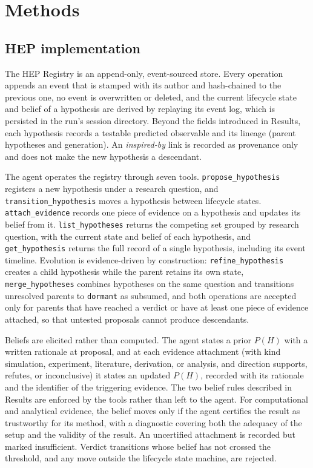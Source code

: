 \section{Methods}\label{sec:methods}

\subsection{HEP implementation}
The HEP Registry is an append-only, event-sourced store.
Every operation appends an event that is stamped with its author and
hash-chained to the previous one, no event is overwritten or deleted,
and the current lifecycle state and belief of a hypothesis are derived
by replaying its event log, which is persisted in the run's session
directory.
Beyond the fields introduced in Results, each hypothesis records a
testable predicted observable and its lineage (parent hypotheses and
generation).
An \emph{inspired-by} link is recorded as provenance only
and does not make the new hypothesis a descendant.

The agent operates the registry through seven tools.
\texttt{propose\_hypothesis} registers a new hypothesis under a
research question, and \texttt{transition\_hypothesis} moves a
hypothesis between lifecycle states.
\texttt{attach\_evidence} records one piece of evidence on a
hypothesis and updates its belief from it.
\texttt{list\_hypotheses} returns the competing set grouped by
research question, with the current state and belief of each
hypothesis, and \texttt{get\_hypothesis} returns the full record of a
single hypothesis, including its event timeline.
Evolution is evidence-driven by construction:
\texttt{refine\_hypothesis} creates a child hypothesis while the
parent retains its own state, \texttt{merge\_hypotheses} combines
hypotheses on the same question and transitions unresolved parents to
\texttt{dormant} as subsumed, and both operations are accepted only
for parents that have reached a verdict or have at least one piece of
evidence attached, so that untested proposals cannot produce
descendants.

Beliefs are elicited rather than computed.
The agent states a prior
$P(H)$ with a written rationale at proposal, and at each evidence
attachment (with kind simulation, experiment, literature, derivation,
or analysis, and direction supports, refutes, or inconclusive) it
states an updated $P(H)$, recorded with its rationale and the
identifier of the triggering evidence.
The two belief rules described in Results are enforced by the tools
rather than left to the agent.
For computational and analytical evidence, the belief moves only if
the agent certifies the result as trustworthy for its method, with a
diagnostic covering both the adequacy of the setup and the validity of
the result.
An uncertified attachment is recorded but marked
insufficient.
Verdict transitions whose belief has not crossed the threshold, and
any move outside the lifecycle state machine, are rejected.

